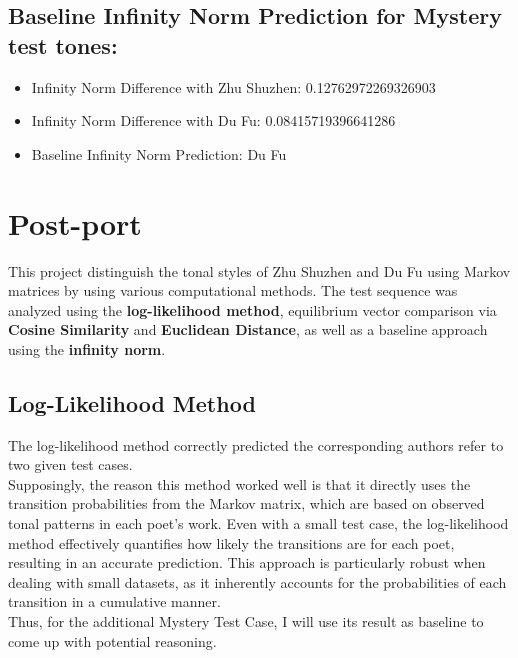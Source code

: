 \documentclass[12pt]{article}
\begin{document}
\subsection*{Baseline Infinity Norm Prediction for Mystery test tones:}


\begin{itemize}
    \item Infinity Norm Difference with Zhu Shuzhen: 0.12762972269326903
    \item Infinity Norm Difference with Du Fu: 0.08415719396641286
    \item Baseline Infinity Norm Prediction: Du Fu
\end{itemize}

\newpage

\section{Post-port}
This project distinguish the tonal styles of Zhu Shuzhen and Du Fu using Markov matrices by using various computational methods. The test sequence was analyzed using the \textbf{log-likelihood method}, equilibrium vector comparison via \textbf{Cosine Similarity} and \textbf{Euclidean Distance}, as well as a baseline approach using the \textbf{infinity norm}.

\subsection*{Log-Likelihood Method}

The log-likelihood method correctly predicted the corresponding authors refer to two given test cases.
\\
Supposingly, the reason this method worked well is that it directly uses the transition probabilities from the Markov matrix, which are based on observed tonal patterns in each poet's work. Even with a small test case, the log-likelihood method effectively quantifies how likely the transitions are for each poet, resulting in an accurate prediction. 
This approach is particularly robust when dealing with small datasets, as it inherently accounts for the probabilities of each transition in a cumulative manner.
\\
Thus, for the additional Mystery Test Case, I will use its result as baseline to come up with potential reasoning.
\end{document}
